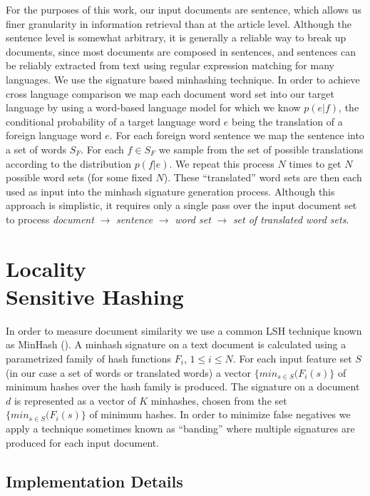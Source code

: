 \documentclass{acm_proc_article-sp}
\begin{document}
For the purposes of this work, our input documents are sentence, which allows us finer granularity in information retrieval than at the article level. Although the sentence level is somewhat arbitrary, it is generally a reliable way to break up documents, since most documents are composed in sentences, and sentences can be reliably extracted from text using regular expression matching for many languages. We use the signature based minhashing technique. In order to achieve cross language comparison we map each document word set into our target language by using a word-based language model for which we know $p(e|f)$, the conditional probability of a target language word $e$ being the translation of a foreign language word $e$. For each foreign word sentence we map the sentence into a set of words $S_F$. For each $f \in S_F$ we sample from the set of possible translations according to the distribution $p(f|e)$. We repeat this process $N$ times to get $N$ possible word sets (for some fixed $N$). These ``translated'' word sets are then each used as input into the minhash signature generation process. Although this approach is simplistic, it requires only a single pass over the input document set to process \emph{document} $\rightarrow$ \emph{sentence} $\rightarrow$ \emph{word set} $\rightarrow$ \emph{set of translated word sets}.

\section{Locality \\ Sensitive Hashing}

In order to measure document similarity we use a common LSH technique known as MinHash (\cite{broder:resemblance}). A minhash signature on a text document is calculated using a parametrized family of hash functions $F_i$, $1 \le i \le N$. For each input feature set $S$ (in our case a set of words or translated words) a vector $\{min_{s \in S}(F_i(s)\}$ of minimum hashes over the hash family is produced. The signature on a document $d$ is represented as a vector of $K$ minhashes, chosen from the set $\{min_{s \in S}(F_i(s)\}$ of minimum hashes. In order to minimize false negatives we apply a technique sometimes known as ``banding'' \cite{ullman:massive} where multiple signatures are produced for each input document.

\subsection{Implementation Details}
\end{document}
